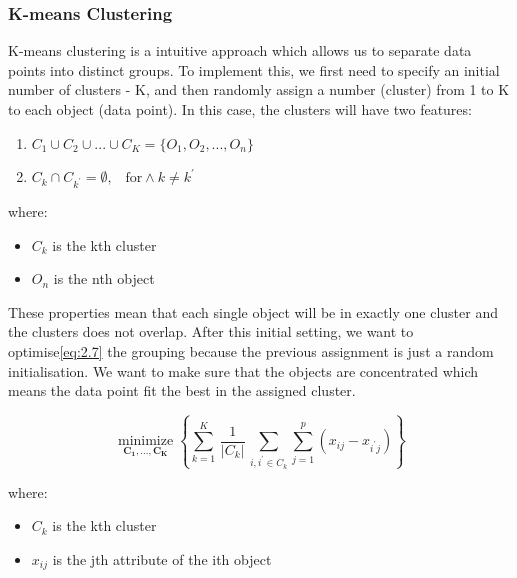 \documentclass[11pt]{article} %
\theoremstyle{plain}
\theoremstyle{definition}
\begin{document}
\subsubsection{K-means Clustering}

K-means clustering is a intuitive approach which allows us to separate data points into distinct groups. To implement this, we first need to specify an initial number of clusters - K, and then randomly assign a number (cluster) from 1 to K to each object (data point). In this case, the clusters will have two features\cite{james/itsl:2009}:
{
  \begin{enumerate}
    \item ${C_1}\cup{C_2}\cup...\cup{C_K} = \{{O_1}, {O_2},..., {O_n}\}$
    \item ${C_k}\cap{C_{k^\prime}} = \emptyset \text{,}\quad \text{for} \wedge k \neq k^\prime$
  \end{enumerate}

  \footnotesize
  where:
    \begin{itemize}[label=-, leftmargin=4em, itemsep=0.1em]
      \item ${C_k}$ is the kth cluster
      \item ${O_n}$ is the nth object
    \end{itemize}
}

These properties mean that each single object will be in exactly one cluster and the clusters does not overlap. After this initial setting, we want to optimise\eqref{eq:2.7} the grouping because the previous assignment is just a random initialisation. We want to make sure that the objects are concentrated which means the data point fit the best in the assigned cluster.

{
  \begin{equation}
    \label{eq:2.7}
    \tag{2.7}
    {{\underset {\mathbf {C_1,...,C_K} }{\operatorname {minimize} }}\left\{\sum _{k=1}^{K}\,{\frac {1}{|C_{k}|}}\,\sum _{ {i} , {i^\prime} \in C_{k}}\sum_{j=1}^{p}(x_{ij}-x_{{i^\prime}j})\right\}}
  \end{equation}

  \footnotesize
  where:
  \begin{itemize}[label=-, leftmargin=4em, itemsep=0.1em]
    \item ${C_k}$ is the kth cluster
    \item ${x_{ij}}$ is the jth attribute of the ith object
  \end{itemize}
}
\end{document}
